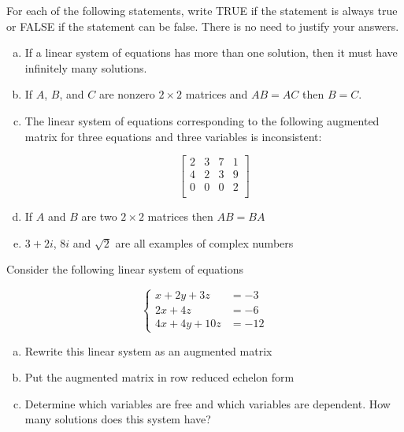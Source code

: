 \documentclass[11pt]{exam}
\theoremstyle{definition}
\begin{document}
\begin{questions}
\newpage
\question[10]\mbox{}

For each of the following statements, write TRUE if the statement is always true or FALSE if the statement can be false.
There is no need to justify your answers.

\begin{enumerate}[(a)]
\item If a linear system of equations has more than one solution, then it must have infinitely many solutions.
\vspace{1.1in}
\item If $A$, $B$, and $C$ are nonzero $2\times 2$ matrices and $AB = AC$ then $B=C$.
\vspace{1.1in}
\item The linear system of equations corresponding to the following augmented matrix for three equations and three variables is inconsistent:

$$\left[\begin{array}{ccc|c}
2 & 3 & 7 & 1\\
4 & 2 & 3 & 9\\
0 & 0 & 0 & 2\\
\end{array}\right]$$
\vspace{1.1in}

\item If $A$ and $B$ are two $2\times 2$ matrices then $AB = BA$
\vspace{1.1in}

\item $3+2i$, $8i$ and $\sqrt{2}$ are all examples of complex numbers
\end{enumerate}


\newpage
\question[10]\mbox{}


Consider the following linear system of equations

$$\left\lbrace\begin{array}{cc}
x + 2y + 3z &= -3\\
2x + 4z     &=-6\\
4x +4y +  10z     &=-12
\end{array}\right.$$

\begin{enumerate}[(a)]
\item Rewrite this linear system as an augmented matrix
\vspace{1.5in}
\item Put the augmented matrix in row reduced echelon form
\vspace{4in}
\item Determine which variables are free and which variables are dependent.  How many solutions does this system have?
\end{enumerate}

\end{questions}
\end{document}
